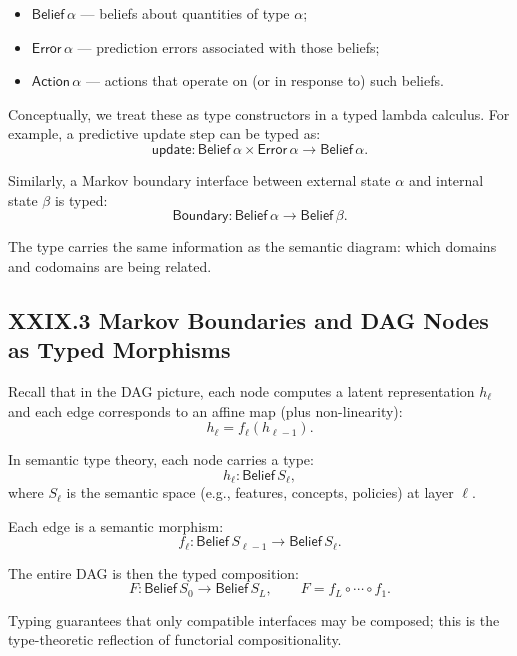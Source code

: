 \documentclass[12pt,letterpaper]{article}
\begin{document}
\begin{itemize}
  \item $\mathsf{Belief}\,\alpha$ --- beliefs about quantities of type $\alpha$;
  \item $\mathsf{Error}\,\alpha$ --- prediction errors associated with those beliefs;
  \item $\mathsf{Action}\,\alpha$ --- actions that operate on (or in response to) such beliefs.
\end{itemize}

Conceptually, we treat these as type constructors in a typed lambda calculus. For example, a predictive update step can be typed as:
\[
\mathsf{update} : \mathsf{Belief}\,\alpha \times \mathsf{Error}\,\alpha \to \mathsf{Belief}\,\alpha.
\]

Similarly, a Markov boundary interface between external state $\alpha$ and internal state $\beta$ is typed:
\[
\mathsf{Boundary} : \mathsf{Belief}\,\alpha \to \mathsf{Belief}\,\beta.
\]

The type carries the same information as the semantic diagram: which domains and codomains are being related.

\subsection{XXIX.3 Markov Boundaries and DAG Nodes as Typed Morphisms}

Recall that in the DAG picture, each node computes a latent representation $h_\ell$ and each edge corresponds to an affine map (plus non-linearity):
\[
h_{\ell} = f_\ell(h_{\ell-1}).
\]

In semantic type theory, each node carries a type:
\[
h_\ell : \mathsf{Belief}\,S_\ell,
\]
where $S_\ell$ is the semantic space (e.g., features, concepts, policies) at layer $\ell$.

Each edge is a semantic morphism:
\[
f_\ell : \mathsf{Belief}\,S_{\ell-1} \to \mathsf{Belief}\,S_{\ell}.
\]

The entire DAG is then the typed composition:
\[
F : \mathsf{Belief}\,S_0 \to \mathsf{Belief}\,S_L, \qquad
F = f_L \circ \cdots \circ f_1.
\]

Typing guarantees that only compatible interfaces may be composed; this is the type-theoretic reflection of functorial compositionality.

\end{document}
